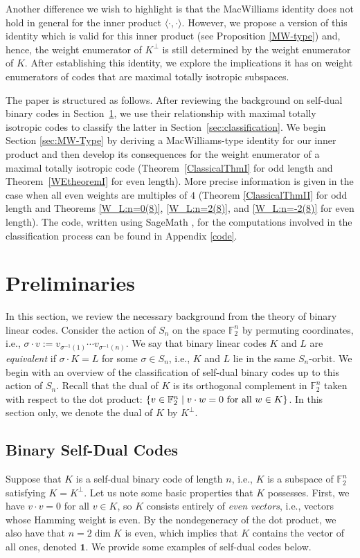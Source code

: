 \documentclass[a4paper,reqno]{amsart}
\newcommand{\bydef}{:=}
\theoremstyle{definition}
\theoremstyle{remark} \newtheorem{remark}[theorem]{Remark}
\numberwithin{equation}{section}
\begin{document}
Another difference we wish to highlight is that the MacWilliams identity does not hold in general for the inner product \(\langle \cdot, \cdot \rangle\). However, we propose a version of this identity which is valid for this inner product (see Proposition \ref{MW-type}) and, hence, the weight enumerator of \(K^\perp\) is still determined by the weight enumerator of \(K\). After establishing this identity, we explore the implications it has on weight enumerators of codes that are maximal totally isotropic subspaces.

The paper is structured as follows. After reviewing the background on self-dual binary codes in Section~\ref{sec:prelim}, we use their relationship with maximal totally isotropic codes to classify the latter in Section~\ref{sec:classification}.
We begin Section \ref{sec:MW-Type} by deriving a MacWilliams-type identity for our inner product and then develop its consequences for the weight enumerator of a maximal totally isotropic code (Theorem~\ref{ClassicalThmI} for odd length and Theorem~\ref{WEtheoremI} for even length). More precise information is given in the case when all even weights are multiples of $4$ (Theorem \ref{ClassicalThmII} for odd length and Theorems \ref{W_L:n=0(8)}, \ref{W_L:n=2(8)}, and \ref{W_L:n=-2(8)} for even length). The code, written using SageMath \cite{sage}, for the computations involved in the classification process can be found in Appendix \ref{code}.

\section{Preliminaries}\label{sec:prelim}
In this section, we review the necessary background from the theory of binary linear codes. Consider the action of \(S_n\) on the space \(\mathbb{F}_2^n\) by permuting coordinates, i.e., \(\sigma \cdot v \bydef v_{\sigma^{-1}(1)} \cdots v_{\sigma^{-1}(n)}\). We say that binary linear codes \(K\) and \(L\) are \emph{equivalent} if \(\sigma \cdot K = L\) for some \(\sigma \in S_n\), i.e., \(K\) and \(L\) lie in the same \(S_n\)-orbit. We begin with an overview of the classification of self-dual binary codes up to this action of \(S_n\). Recall that the dual of \(K\) is its orthogonal complement in \(\mathbb{F}_2^n\) taken with respect to the dot product: \(\{v \in \mathbb{F}_2^n \mid v \cdot w = 0 \textnormal{ for all } w \in K\}\). In this section only, we denote the dual of \(K\) by \(K^\perp\). 

\subsection{Binary Self-Dual Codes} Suppose that \(K\) is a self-dual binary code of length \(n\), i.e., \(K\) is a subspace of \(\mathbb{F}_2^n\) satisfying \(K = K^\perp\). Let us note some basic properties that \(K\) possesses. First, we have \(v \cdot v = 0\) for all \(v \in K\), so \(K\) consists entirely of \emph{even vectors}, i.e., vectors whose Hamming weight is even. By the nondegeneracy of the dot product, we also have that \(n = 2 \dim K\) is even, which implies  that \(K\) contains the vector of all ones, denoted \(\textbf{1}\). We provide some examples of self-dual codes below. 
\end{document}

